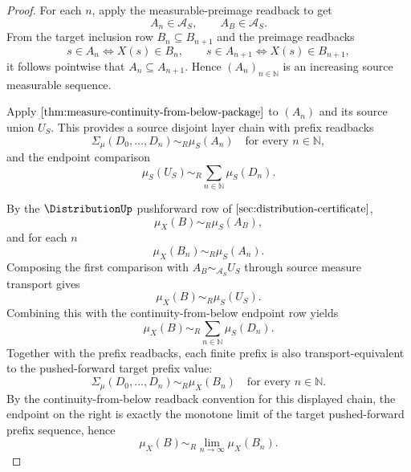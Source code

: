 \begin{proof}
For each $n$, apply the measurable-preimage readback to get
$$
A_n\in\mathcal A_S,\qquad A_B\in\mathcal A_S.
$$
From the target inclusion row $B_n\subseteq B_{n+1}$ and the preimage readbacks
$$
s\in A_n\Longleftrightarrow X(s)\in B_n,
\qquad s\in A_{n+1}\Longleftrightarrow X(s)\in B_{n+1},
$$
it follows pointwise that $A_n\subseteq A_{n+1}$. Hence $(A_n)_{n\in\mathbb N}$ is an increasing source measurable sequence.

Apply $\autoref{thm:measure-continuity-from-below-package}$ to $(A_n)$ and its source union $U_S$. This provides a source disjoint layer chain with prefix readbacks
$$
\Sigma_\mu(D_0,\dots,D_n)\sim_R\mu_S(A_n)\quad\text{for every }n\in\mathbb N,
$$
and the endpoint comparison
$$
\mu_S(U_S)\sim_R\sum_{n\in\mathbb N}\mu_S(D_n).
$$

By the $\DistributionUp$ pushforward row of $\autoref{sec:distribution-certificate}$,
$$
\mu_X(B)\sim_R\mu_S(A_B),
$$
and for each $n$
$$
\mu_X(B_n)\sim_R\mu_S(A_n).
$$
Composing the first comparison with $A_B\sim_{\mathcal A_S}U_S$ through source measure transport gives
$$
\mu_X(B)\sim_R\mu_S(U_S).
$$
Combining this with the continuity-from-below endpoint row yields
$$
\mu_X(B)\sim_R\sum_{n\in\mathbb N}\mu_S(D_n).
$$
Together with the prefix readbacks, each finite prefix is also transport-equivalent to the pushed-forward target prefix value:
$$
\Sigma_\mu(D_0,\dots,D_n)\sim_R\mu_X(B_n)\quad\text{for every }n\in\mathbb N.
$$
By the continuity-from-below readback convention for this displayed chain, the endpoint on the right is exactly the monotone limit of the target pushed-forward prefix sequence, hence
$$
\mu_X(B)\sim_R\lim_{n\to\infty}\mu_X(B_n).
$$
\end{proof}

